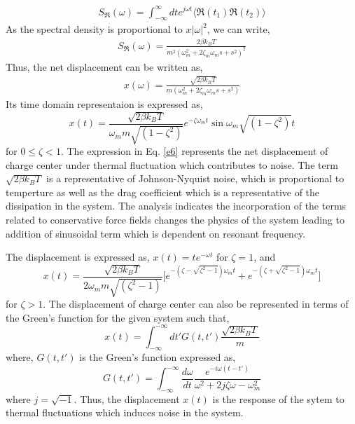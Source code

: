 \documentclass[12pt,column,showpacs,pre,preprintnumbers,amsmath,amssymb,aps,standalone]{revtex4-2}
\begin{document}
\begin{align} \label{e3}
S_\Re(\omega)=\int_{-\infty}^\infty dt e^{j\omega t} \langle\Re(t_1)\Re(t_2)\rangle   
\end{align}
As the spectral density is proportional to $x|\omega|^2$,  we can write,   
\begin{align} \label{e4}
S_\Re(\omega)=\frac{2\beta k_BT}{m^2(\omega_m^2+2\zeta_m \omega_ms+s^2)^2}  
\end{align}     
Thus, the net displacement can be written as,
\begin{align} \label{e5}
x(\omega)=\frac{\sqrt{2\beta k_BT}}{m(\omega_m^2+2\zeta_m \omega_ms+s^2)}  
\end{align}   
Its time domain representaion is expressed as,
\begin{equation}\label{e6}
x(t)=\frac{ \sqrt{2\beta k_BT}}{\omega_m m\sqrt{(1-\zeta^2)}}e^{-\zeta\omega_m t}\sin{\omega_m\sqrt{(1-\zeta^2)} t}
\end{equation}
for $0\leq\zeta<1$. The expression in Eq. \ref{e6}  represents the net displacement of charge center under thermal fluctuation which contributes to noise. The term $\sqrt{2\beta k_BT }$ is a representative of Johnson-Nyquist noise, which is proportional to temperture as well as the drag coefficient which is a representative of the dissipation in the system. The analysis indicates the incorporation of the terms related to conservative force fields changes the physics of the system leading to addition of sinusoidal term which is dependent on resonant frequency. 

The displacement is expressed as, $x(t)=te^{-\omega t}$ for $\zeta=1$, and
\begin{equation}\label{e7}
x(t)=\frac{\sqrt{2\beta k_BT }}{2\omega_mm\sqrt{(\zeta^2-1)}}\Big[e^{-(\zeta-\sqrt{\zeta^2-1})\omega_m t}+e^{-(\zeta+\sqrt{\zeta^2-1})\omega_m t}\Big]
\end{equation}
for $\zeta>1$. 
The displacement of charge center can also be represented in terms of the Green's function for the given system such that, \begin{equation}\label{e8}
x(t)=\int_{-\infty}^{-\infty}dt'G(t,t')\frac{\sqrt{2\beta k_BT}}{m}
\end{equation}
where, $ G(t,t') $ is the Green's function expressed as,
\begin{equation}\label{e9}
G(t,t')=\int_{-\infty}^{-\infty}\frac{d \omega}{dt}\frac{e^{-i\omega(t-t')}}{\omega^2+2j\zeta\omega-\omega_m^2} 
\end{equation}
where $ j=\sqrt{-1} $. Thus, the displacement $ x(t) $ is the response of the sytem to thermal fluctuations which induces noise in the system.
\end{document}
